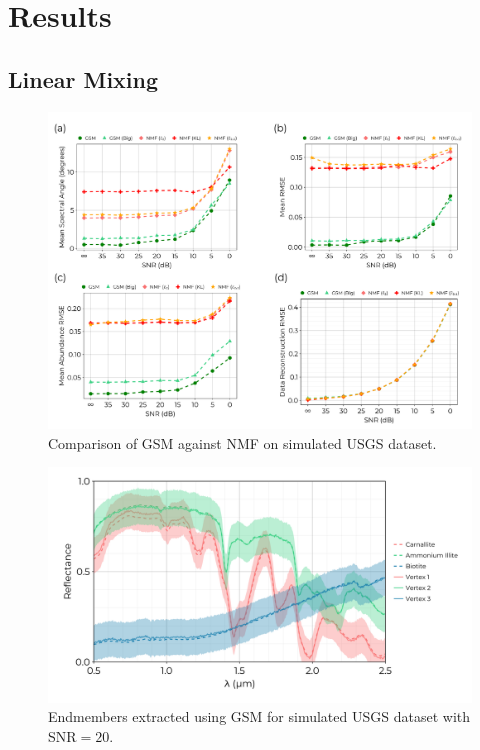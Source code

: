 \documentclass[remotesensing,article,submit,pdftex,moreauthors]{Definitions/mdpi}
\begin{document}
\section{Results}
\subsection{Linear Mixing}

\begin{figure}[H]
\includegraphics[width=\columnwidth]{results/usgs/fit-comparison.pdf}
\caption{Comparison of GSM against NMF on simulated USGS dataset. \label{fig:usgs-fits}}
\end{figure}  


\begin{figure}[H]
\includegraphics[width=\columnwidth]{results/usgs/extracted-endmembers.png}
\caption{Endmembers extracted using GSM for simulated USGS dataset with SNR$=20$. \label{fig:usgs-endmembers}}
\end{figure}  
\end{document}
